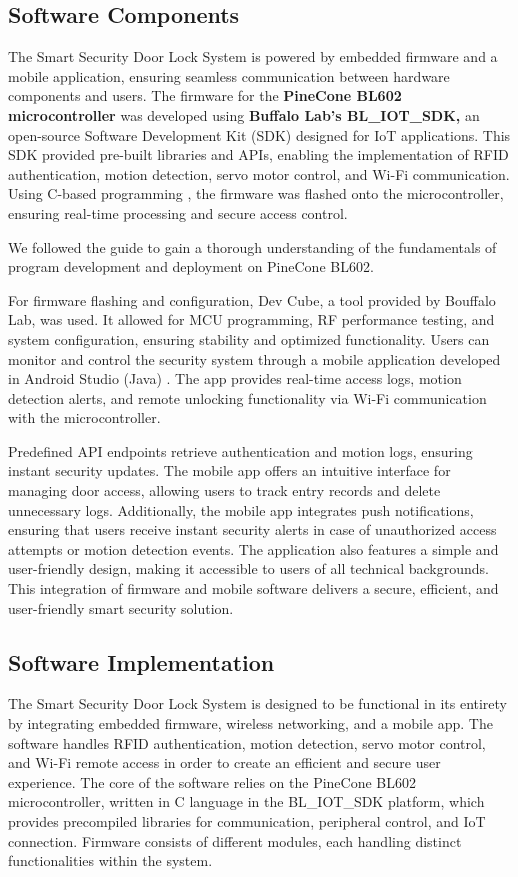 \documentclass[a4paper]{scrartcl}
\begin{document}
\subsection{Software Components}
The Smart Security Door Lock System is powered by embedded firmware and a mobile application, ensuring seamless communication between hardware components and users. The firmware for the \textbf{PineCone BL602 microcontroller} was developed using \textbf{Buffalo Lab's BL\_IOT\_SDK,} an open-source Software Development Kit (SDK) designed for IoT applications. This SDK provided pre-built libraries and APIs, enabling the implementation of RFID authentication, motion detection, servo motor control, and Wi-Fi communication. Using C-based programming \cite{CDevDocs}, the firmware was flashed onto the microcontroller, ensuring real-time processing and secure access control.

We followed the guide \cite{BLFlashEnv} to gain a thorough understanding of the fundamentals of program development and deployment on PineCone BL602.

For firmware flashing and configuration, Dev Cube, a tool provided by Bouffalo Lab, was used. It allowed for MCU programming, RF performance testing, and system configuration, ensuring stability and optimized functionality. Users can monitor and control the security system through a mobile application developed in Android Studio (Java) \cite{JavaOracleDocs} \cite{AndroidStudio}. The app provides real-time access logs, motion detection alerts, and remote unlocking functionality via Wi-Fi communication with the microcontroller.

Predefined API endpoints retrieve authentication and motion logs, ensuring instant security updates. The mobile app offers an intuitive interface for managing door access, allowing users to track entry records and delete unnecessary logs. Additionally, the mobile app integrates push notifications, ensuring that users receive instant security alerts in case of unauthorized access attempts or motion detection events. The application also features a simple and user-friendly design, making it accessible to users of all technical backgrounds. This integration of firmware and mobile software delivers a secure, efficient, and user-friendly smart security solution.




\subsection{Software Implementation}
The Smart Security Door Lock System is designed to be functional in its entirety by integrating embedded firmware, wireless networking, and a mobile app. The software handles RFID authentication, motion detection, servo motor control, and Wi-Fi remote access in order to create an efficient and secure user experience. The core of the software relies on the PineCone BL602 microcontroller, written in C language in the BL\_IOT\_SDK platform, which provides precompiled libraries for communication, peripheral control, and IoT connection. Firmware consists of different modules, each handling distinct functionalities within the system.
\end{document}
